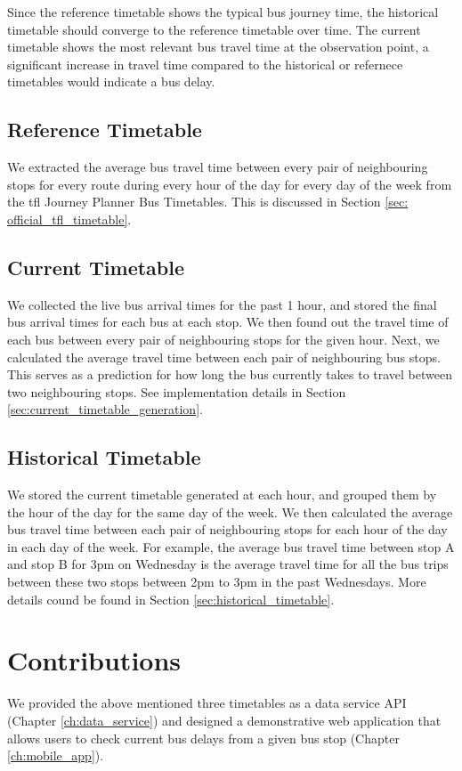 \par Since the reference timetable shows the typical bus journey time, the historical timetable should converge to the reference timetable over time. The current timetable shows the most relevant bus travel time at the observation point, a significant increase in travel time compared to the historical or refernece timetables would indicate a bus delay.

\subsection{Reference Timetable}
\par We extracted the average bus travel time between every pair of neighbouring stops for every route during every hour of the day for every day of the week from the \acrshort{tfl} Journey Planner Bus Timetables. This is discussed in Section \ref{sec: official_tfl_timetable}.

\subsection{Current Timetable}
\par We collected the live bus arrival times for the past 1 hour, and stored the final bus arrival times for each bus at each stop. We then found out the travel time of each bus between every pair of neighbouring stops for the given hour. Next, we calculated the average travel time between each pair of neighbouring bus stops. This serves as a prediction for how long the bus currently takes to travel between two neighbouring stops. See implementation details in Section \ref{sec:current_timetable_generation}.

\subsection{Historical Timetable}
\par We stored the current timetable generated at each hour, and grouped them by the hour of the day for the same day of the week. We then calculated the average bus travel time between each pair of neighbouring stops for each hour of the day in each day of the week. For example, the average bus travel time between stop A and stop B for 3pm on Wednesday is the average travel time for all the bus trips between these two stops between 2pm to 3pm in the past Wednesdays. More details cound be found in Section \ref{sec:historical_timetable}.

\section{Contributions}
\par We provided the above mentioned three timetables as a data service API (Chapter \ref{ch:data_service}) and designed a demonstrative web application that allows users to check current bus delays from a given bus stop (Chapter \ref{ch:mobile_app}).

